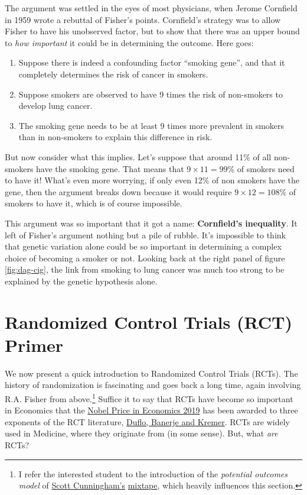 \documentclass[]{book}
\providecommand{\tightlist}{%
  \setlength{\itemsep}{0pt}\setlength{\parskip}{0pt}}
\begin{document}
The argument was settled in the eyes of most physicians, when Jerome
Cornfield in 1959 wrote a rebuttal of Fisher's points. Cornfield's
strategy was to allow Fisher to have his unobserved factor, but to show
that there was an upper bound to \emph{how important} it could be in
determining the outcome. Here goes:

\begin{enumerate}
\def\labelenumi{\arabic{enumi}.}
\tightlist
\item
  Suppose there is indeed a confounding factor ``smoking gene'', and
  that it completely determines the risk of cancer in smokers.
\item
  Suppose smokers are observed to have 9 times the risk of non-smokers
  to develop lung cancer.
\item
  The smoking gene needs to be at least 9 times more prevalent in
  smokers than in non-smokers to explain this difference in risk.
\end{enumerate}

But now consider what this implies. Let's suppose that around 11\% of
all non-smokers have the smoking gene. That means that
\(9\times 11 = 99\%\) of smokers need to have it! What's even more
worrying, if only even 12\% of non smokers have the gene, then the
argument breaks down because it would require \(9\times 12 = 108\%\) of
smokers to have it, which is of course impossible.

This argument was so important that it got a name: \textbf{Cornfield's
inequality}. It left of Fisher's argument nothing but a pile of rubble.
It's impossible to think that genetic variation alone could be so
important in determining a complex choice of becoming a smoker or not.
Looking back at the right panel of figure \ref{fig:dag-cig}, the link
from smoking to lung cancer was much too strong to be explained by the
genetic hypothesis alone.

\section{Randomized Control Trials (RCT) Primer}\label{rct}

We now present a quick introduction to Randomized Control Trials (RCTs).
The history of randomization is fascinating and goes back a long time,
again involving R.A. Fisher from above.\footnote{I refer the interested
  student to the introduction of the \emph{potential outcomes model} of
  \href{https://twitter.com/causalinf}{Scott Cunningham's}
  \href{http://scunning.com/cunningham_mixtape.pdf}{mixtape}, which
  heavily influences this section.} Suffice it to say that RCTs have
become so important in Economics that the
\href{https://www.nobelprize.org/prizes/economic-sciences/2019/summary/}{Nobel
Price in Economics 2019} has been awarded to three exponents of the RCT
literature,
\href{https://www.economist.com/finance-and-economics/2019/10/17/a-nobel-economics-prize-goes-to-pioneers-in-understanding-poverty}{Duflo,
Banerje and Kremer}. RCTs are widely used in Medicine, where they
originate from (in some sense). But, what \emph{are} RCTs?
\end{document}
